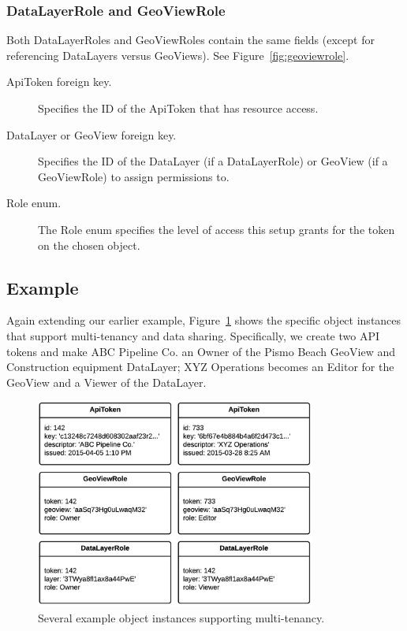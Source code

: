 \subsubsection{DataLayerRole and GeoViewRole}

Both DataLayerRoles and GeoViewRoles contain the same fields (except for referencing DataLayers versus GeoViews). See Figure~\ref{fig:geoviewrole}.


\begin{description}
\item[ApiToken foreign key.] 
Specifies the ID of the ApiToken that has resource access.

\item[DataLayer or GeoView foreign key.] 
Specifies the ID of the DataLayer (if a DataLayerRole) or GeoView (if a GeoViewRole) to assign permissions to.

\item[Role enum.] 
The Role enum specifies the level of access this setup grants for the token on the chosen object.
\end{description}


\subsection{Example} Again extending our earlier example, Figure~\ref{fig:ex2} shows the specific object instances that support multi-tenancy and data sharing. Specifically, we create two API tokens and make ABC Pipeline Co. an Owner of the Pismo Beach GeoView and Construction equipment DataLayer; XYZ Operations becomes an Editor for the GeoView and a Viewer of the DataLayer.

\begin{figure}[ht]
    \centering
    \includegraphics[width=0.82\textwidth]{figures/ex2.png}
    \caption{Several example object instances supporting multi-tenancy.}
    \label{fig:ex2}
\end{figure}

